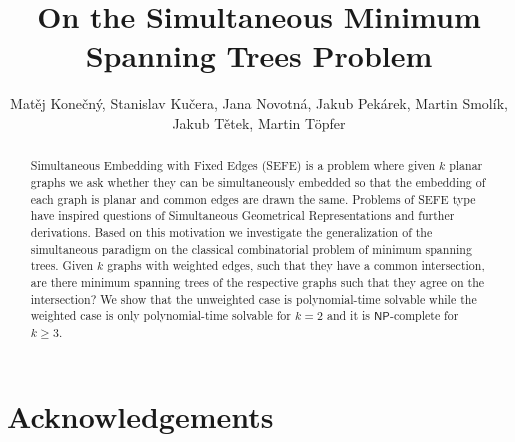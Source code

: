 \documentclass{llncs}
\newcommand{\NP}{{$\mathsf{NP}$}\xspace}
\begin{document}
\title{On the Simultaneous Minimum Spanning Trees Problem}

\author{
Mat\v ej Kone\v cn\'y,
Stanislav Ku\v cera,
Jana Novotn\'a, 
Jakub Pek\'{a}rek, 
Martin Smol\'ik,
Jakub T\v etek,
Martin T\"opfer}
\maketitle

\begin{abstract}


Simultaneous Embedding with Fixed Edges (SEFE) \cite{b:sefe} is a problem where given $k$ planar graphs we ask whether they can be simultaneously embedded so that the embedding of each graph is planar and common edges are drawn the same. Problems of SEFE type have inspired questions of Simultaneous Geometrical Representations and further derivations. Based on this motivation we investigate the generalization of the simultaneous paradigm on the classical combinatorial problem of minimum spanning trees. Given $k$ graphs with weighted edges, such that they have a common intersection, are there minimum spanning trees of the respective graphs such that they agree on the intersection? We show that the unweighted case is polynomial-time solvable while the weighted case is only polynomial-time solvable for $k=2$ and it is \NP-complete for $k\geq 3$. 



\end{abstract}







%

\section{Acknowledgements}
\end{document}

